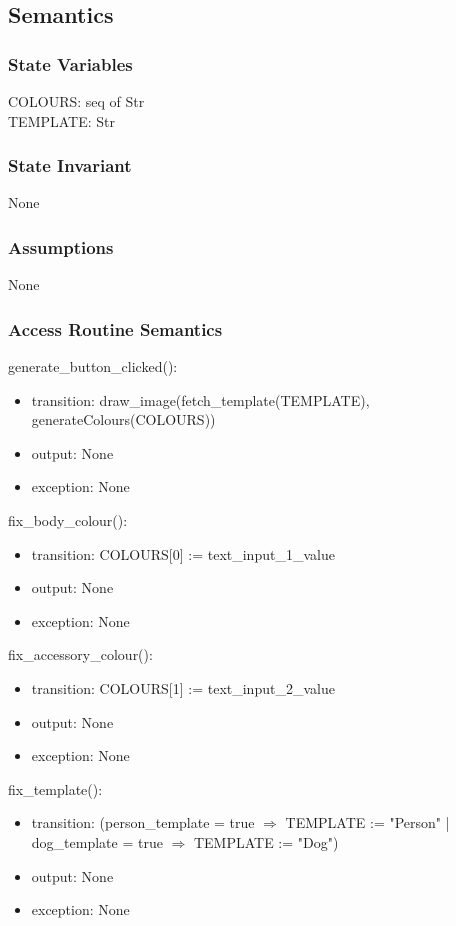 \documentclass[12pt, titlepage]{article}
\begin{document}
\subsection* {Semantics}

\subsubsection* {State Variables}

COLOURS: seq of Str \\
TEMPLATE: Str\\

\subsubsection* {State Invariant}

None

\subsubsection* {Assumptions}

None

\subsubsection* {Access Routine Semantics}

generate\_button\_clicked():
\begin{itemize}
\item transition: draw\_image(fetch\_template(TEMPLATE), generateColours(COLOURS))
\item output: None
\item exception: None
\end{itemize}

\hspace{-18pt}fix\_body\_colour():
\begin{itemize}
\item transition: COLOURS[0] := text\_input\_1\_value
\item output: None
\item exception: None
\end{itemize}

\hspace{-18pt}fix\_accessory\_colour():
\begin{itemize}
\item transition: COLOURS[1] := text\_input\_2\_value
\item output: None
\item exception: None
\end{itemize}

\hspace{-18pt}fix\_template():
\begin{itemize}
\item transition: (person\_template = true $\Rightarrow$ TEMPLATE := "Person" | dog\_template = true $\Rightarrow$ TEMPLATE := "Dog")
\item output: None
\item exception: None
\end{itemize}
\end{document}
